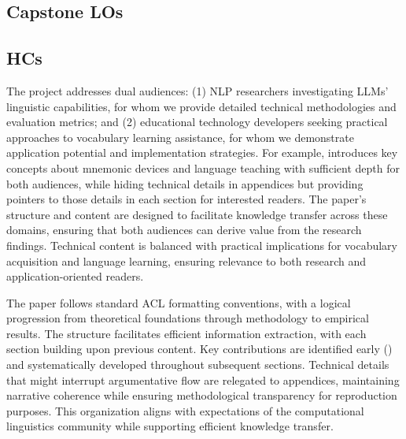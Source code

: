 \subsection{Capstone LOs} \label{sec:capstone-los}
 

\subsection{HCs} \label{sec:hcs}
 The project addresses dual audiences: (1) NLP researchers investigating LLMs' linguistic capabilities, for whom we provide detailed technical methodologies and evaluation metrics; and (2) educational technology developers seeking practical approaches to vocabulary learning assistance, for whom we demonstrate application potential and implementation strategies. For example,  introduces key concepts about mnemonic devices and language teaching with sufficient depth for both audiences, while hiding technical details in appendices but providing pointers to those details in each section for interested readers. The paper's structure and content are designed to facilitate knowledge transfer across these domains, ensuring that both audiences can derive value from the research findings. Technical content is balanced with practical implications for vocabulary acquisition and language learning, ensuring relevance to both research and application-oriented readers.

 The paper follows standard ACL formatting conventions, with a logical progression from theoretical foundations through methodology to empirical results. The structure facilitates efficient information extraction, with each section building upon previous content. Key contributions are identified early () and systematically developed throughout subsequent sections. Technical details that might interrupt argumentative flow are relegated to appendices, maintaining narrative coherence while ensuring methodological transparency for reproduction purposes. This organization aligns with expectations of the computational linguistics community while supporting efficient knowledge transfer.

